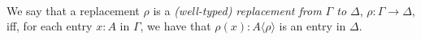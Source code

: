 \begin{code}
\\
%
\\
\>  \AgdaSymbol{(} \AgdaInductiveConstructor{,} \AgdaSymbol{)} \AgdaSymbol{=} \<%
\\
\> \AgdaSymbol{(} \AgdaSymbol{)} \AgdaSymbol{(} \AgdaInductiveConstructor{,} \AgdaSymbol{)} \AgdaSymbol{=}   \<%
\\
%
\\
\> \AgdaSymbol{\{}\AgdaSymbol{\}} \AgdaSymbol{()}\<%
\\
\> \AgdaSymbol{\{\_} \AgdaInductiveConstructor{,} \AgdaSymbol{\_\}}   \AgdaSymbol{=}    \<%
\end{code}

We say that a replacement $\rho$ is a \emph{(well-typed) replacement from $\Gamma$ to $\Delta$},
$\rho : \Gamma \rightarrow \Delta$, iff, for each entry $x : A$ in $\Gamma$, we have that
$\rho(x) : A \langle ρ \rangle$ is an entry in $\Delta$.

